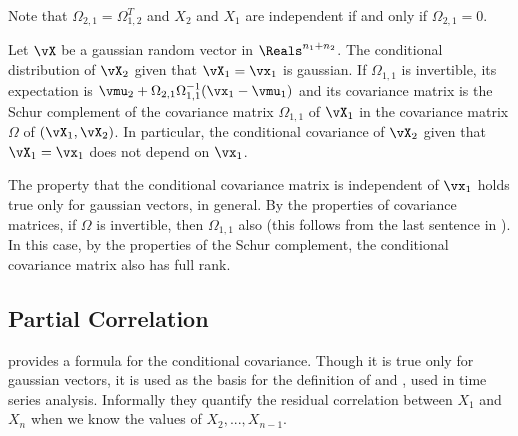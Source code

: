 Note that $\Omega_{2,1}=\Omega_{1,2}^T$ and $X_2$ and $X_1$ are
independent if and only if $\Omega_{2,1}=0$.

\begin{theorem}
 Let $\vX$ be a gaussian random vector in
$\Reals^{n_1+n_2}$. The conditional distribution of $\vX_2$
given that $\vX_1=\vx_1$ is gaussian.
%
If $\Omega_{1,1}$ is invertible, its expectation is $\vmu_2 +
\Omega_{2,1}\Omega_{1,1}^{-1} (\vx_1-\vmu_1)$ and its
covariance matrix is the Schur complement of the covariance
matrix $\Omega_{1,1}$ of $\vX_1$ in the covariance matrix
$\Omega$ of $(\vX_1, \vX_2)$. In particular, the conditional
covariance of $\vX_2$ given that $\vX_1=\vx_1$ does not depend
on $\vx_1$.
\end{theorem}
The property that the conditional covariance matrix is
independent of $\vx_1$ holds true only for gaussian vectors, in
general. By the properties of covariance matrices, if $\Omega$ is invertible, then $\Omega_{1,1}$ also (this follows from the last sentence in ). In this case, by the properties of the Schur complement, the conditional covariance matrix also has full rank.

\subsection{Partial Correlation}
 provides a formula for the
conditional covariance. Though it is true only for
gaussian vectors, it is used as the basis for the
definition of  and
, used in time series
analysis. Informally they quantify the residual
correlation between $X_1$ and $X_n$ when we know the
values of $X_2,...,X_{n-1}$.

